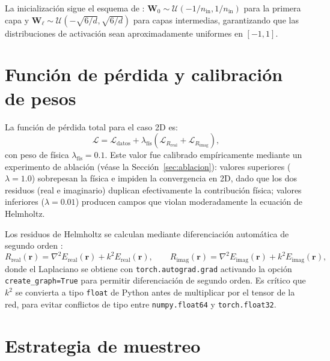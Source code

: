 La inicialización sigue el esquema de \textcite{sitzmann2020siren}:
$\mathbf{W}_0 \sim \mathcal{U}(-1/n_\text{in}, 1/n_\text{in})$ para la primera
capa y $\mathbf{W}_\ell \sim \mathcal{U}(-\sqrt{6/d}, \sqrt{6/d})$ para capas
intermedias, garantizando que las distribuciones de activación sean
aproximadamente uniformes en $[-1, 1]$.

\section{Función de pérdida y calibración de pesos}

La función de pérdida total para el caso 2D es:
%
\begin{equation}
    \mathcal{L} = \mathcal{L}_\text{datos}
    + \lambda_\text{fís}\!\left(
    \mathcal{L}_{R_\text{real}} + \mathcal{L}_{R_\text{imag}}
    \right),
    \label{eq:loss_2d}
\end{equation}
%
con peso de física $\lambda_\text{fís} = 0.1$. Este valor fue calibrado
empíricamente mediante un experimento de ablación (véase la
Sección~\ref{sec:ablacion}): valores superiores ($\lambda = 1.0$) sobrepesan la
física e impiden la convergencia en 2D, dado que los dos residuos (real e
imaginario) duplican efectivamente la contribución física; valores inferiores
($\lambda = 0.01$) producen campos que violan moderadamente la ecuación de
Helmholtz.

Los residuos de Helmholtz se calculan mediante diferenciación automática de
segundo orden \parencite{baydin2018autodiff}:
%
\begin{equation}
    R_\text{real}(\mathbf{r}) = \nabla^2 E_\text{real}(\mathbf{r})
    + k^2 E_\text{real}(\mathbf{r}), \qquad
    R_\text{imag}(\mathbf{r}) = \nabla^2 E_\text{imag}(\mathbf{r})
    + k^2 E_\text{imag}(\mathbf{r}),
\end{equation}
%
donde el Laplaciano se obtiene con \texttt{torch.autograd.grad} activando la
opción \texttt{create\_graph=True} para permitir diferenciación de segundo orden.
Es crítico que $k^2$ se convierta a tipo \texttt{float} de Python antes de
multiplicar por el tensor de la red, para evitar conflictos de tipo entre
\texttt{numpy.float64} y \texttt{torch.float32}.

\section{Estrategia de muestreo}

